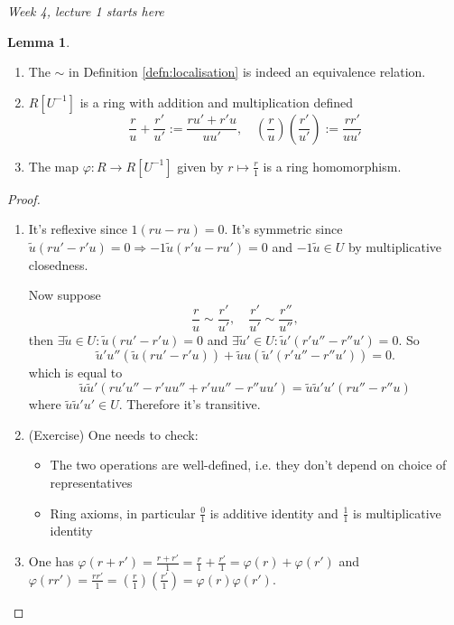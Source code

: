 \documentclass[a4paper]{article}
\theoremstyle{definition}
\newtheorem{lemma}[defn]{Lemma}
\begin{document}
\begin{flushright}
\textit{Week 4, lecture 1 starts here}
\end{flushright}

\begin{lemma}
\begin{enumerate}
\item The $\sim$ in Definition \ref{defn:localisation} is indeed an equivalence relation.
\item $R[U^{-1}]$ is a ring with addition and multiplication defined
\[
\frac{r}{u}+\frac{r'}{u'}:=\frac{ru'+r'u}{uu'},\quad \left(\frac{r}{u}\right)\left(\frac{r'}{u'}\right):=\frac{rr'}{uu'}
\]
\item The map $\varphi:R\rightarrow R[U^{-1}]$ given by $r\mapsto \frac{r}{1}$ is a ring homomorphism.
\end{enumerate}
\end{lemma}
\begin{proof}
\begin{enumerate}
\item It's reflexive since $1(ru-ru)=0$. It's symmetric since $\widetilde u(ru'-r'u)=0\Rightarrow -1\widetilde u(r'u-ru')=0$ and $-1\widetilde u\in U$ by multiplicative closedness.

Now suppose
\[
\frac{r}{u}\sim\frac{r'}{u'},\quad \frac{r'}{u'}\sim\frac{r''}{u''},
\]
then $\exists \widetilde u\in U:\widetilde u(ru'-r'u)=0$ and $\exists \widetilde u'\in U:\widetilde u'(r'u''-r''u')=0$. So
\[
\widetilde u' u'' (\widetilde u(ru'-r'u))+\widetilde u u (\widetilde u'(r'u''-r''u'))=0.
\]
which is equal to
\[
\widetilde u \widetilde u' (ru'u''-r'uu''+r'uu''-r''uu')=\widetilde u \widetilde u' u' (ru''-r''u)
\]
where $\widetilde u \widetilde u' u'\in U$. Therefore it's transitive.
\item (Exercise) One needs to check:
\begin{itemize}
\item The two operations are well-defined, i.e. they don't depend on choice of representatives
\item Ring axioms, in particular $\frac01$ is additive identity and $\frac11$ is multiplicative identity
\end{itemize}
\item One has $\varphi (r+r')=\frac{r+r'}{1}=\frac{r}{1}+\frac{r'}{1}=\varphi(r)+\varphi(r')$ and $\varphi(rr')=\frac{rr'}{1}=\left(\frac{r}{1}\right)\left(\frac{r'}{1}\right)=\varphi(r)\varphi(r')$.
\end{enumerate}
\end{proof}
\end{document}
